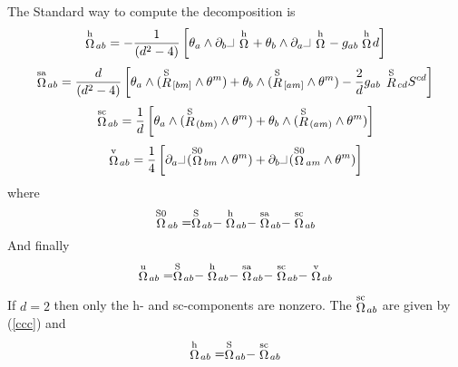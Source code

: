 \documentclass[twoside,openright]{report}
\newcommand{\grgtt}{\ttfamily}
\newcommand{\RR}[1]{\stackrel{\rm #1}{R}\!{}}
\newcommand{\OO}[1]{\stackrel{\rm #1}{\Omega}\!{}}
\newcommand{\ipr}{\rule{1.8mm}{.1mm}\rule{.1mm}{2.2mm}\,} %
\renewcommand{\tt}{\grgtt}
\begin{document}
The {\tt Standard way} to compute the decomposition is
\begin{equation}
\OO{h}_{ab}=-\frac{1}{(d^2-4)}\left[
\theta_a\wedge\partial_b\ipr\OO{h}{}
+\theta_b\wedge\partial_a\ipr\OO{h}{}
-g_{ab}\OO{h}{}d\right]
\end{equation}
\begin{equation}
\OO{sa}_{ab} =\frac{d}{(d^2-4)}\left[
\theta_a\wedge(\RR{S}_{[bm]}\wedge\theta^m)
+\theta_b\wedge(\RR{S}_{[am]}\wedge\theta^m)
-\frac{2}{d}g_{ab}\,\RR{S}_{cd}S^{cd}\right]
\end{equation}
\begin{equation}
\OO{sc}_{ab} =\frac{1}{d}\left[
\theta_a\wedge(\RR{S}_{(bm)}\wedge\theta^m)
+\theta_b\wedge(\RR{S}_{(am)}\wedge\theta^m)\right] \label{ccc}
\end{equation}
\begin{equation}
\OO{v}_{ab} = \frac{1}{4}\left[
\partial_a\ipr(\OO{S0}_{bm}\wedge\theta^m)
+\partial_b\ipr(\OO{S0}_{am}\wedge\theta^m)\right]
\end{equation}
where
\[
\OO{S0}_{ab} =
\OO{S}_{ab}
-\OO{h}_{ab}
-\OO{sa}_{ab}
-\OO{sc}_{ab}
\]
And finally
\begin{equation}
\OO{u}_{ab} =
\OO{S}_{ab}
-\OO{h}_{ab}
-\OO{sa}_{ab}
-\OO{sc}_{ab}
-\OO{v}_{ab}
\end{equation}

If $d=2$ then only the h- and sc-components are nonzero.
The $\OO{sc}_{ab}$ are given by (\ref{ccc}) and
\begin{equation}
\OO{h}_{ab} = \OO{S}_{ab}-\OO{sc}_{ab}
\end{equation}
\end{document}
